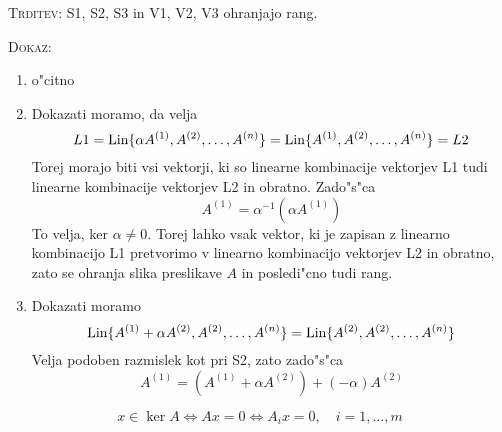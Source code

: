 \textsc{Trditev:} S1, S2, S3 in V1, V2, V3 ohranjajo rang.

\textsc{Dokaz:}
\begin{enumerate}[S1)]
	\item o"citno
	\item  Dokazati moramo, da velja
	\begin{equation*}
	L1 = \text{Lin} \{\alpha A^{(1)}, A^{(2)}, \ldots, A^{(n)}\} = \text{Lin} \{A^{(1)}, A^{(2)}, \ldots, A^{(n)}\} = L2
	\end{equation*}
	Torej morajo biti vsi vektorji, ki so linearne kombinacije vektorjev L1 tudi linearne kombinacije vektorjev L2 in obratno. Zado"s"ca
	\begin{equation*}
	A^{(1)} = \alpha^{-1} (\alpha A^{(1)})
	\end{equation*}
	To velja, ker $\alpha \neq 0$. Torej lahko vsak vektor, ki je zapisan z linearno kombinacijo L1 pretvorimo v linearno kombinacijo vektorjev L2 in obratno, zato se ohranja slika preslikave $A$ in posledi"cno tudi rang.
	
	\item Dokazati moramo
	\begin{equation*}
	\text{Lin} \{A^{(1)} + \alpha A^{(2)}, A^{(2)}, \ldots, A^{(n)}\} = \text{Lin} \{A^{(2)}, A^{(2)}, \ldots, A^{(n)} \}
	\end{equation*}
	Velja podoben razmislek kot pri S2, zato zado"s"ca
	\begin{equation*}
	A^{(1)} = \left(A^{(1)} + \alpha A^{(2)}\right) + (- \alpha) A^{(2)}
	\end{equation*}
\end{enumerate}
\begin{equation*}
x \in \ker A \iff Ax = 0 \iff A_{i} x = 0, \quad i = 1, \ldots, m
\end{equation*}
